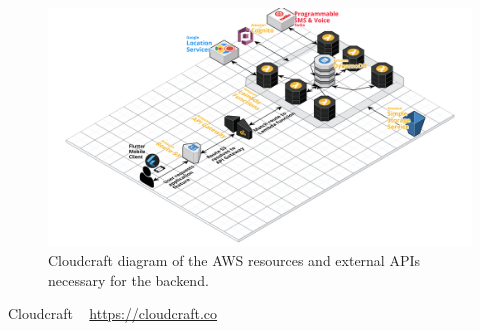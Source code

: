 \documentclass[10pt, a4paper]{article}
\begin{document}
\begin{figure}[H]
\begin{center}
\centerline{
	\includegraphics[scale=.15]{EmergenSeek-Backend.PNG}
}
\caption{Cloudcraft \cite{one} diagram of the AWS resources and external APIs necessary for the backend.}
\label{fig:1}
\end{center}	
\end{figure}
	
\begin{thebibliography}{9}
Cloudcraft ~ \url{https://cloudcraft.co}

\end{thebibliography}
\end{document}
